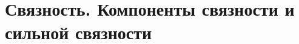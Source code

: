 \documentclass[discrete.tex]{subfiles}
\begin{document}
\section{Связность. Компоненты связности и сильной связности}
\end{document}
